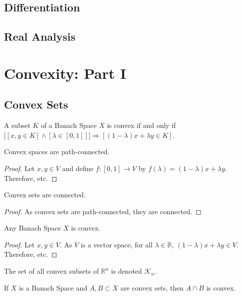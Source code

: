 \documentclass[crop=false,class=book,oneside]{standalone}
\begin{document}
        \subsection{Differentiation}
        \subsection{Real Analysis}
    \section{Convexity: Part I}
        \subsection{Convex Sets}
            \begin{definition}
            A subset $K$ of a Banach Space $X$ is convex if and only if $\big[[x,y\in K]\land  [\lambda \in [0,1]]\big]\Rightarrow[(1-\lambda)x+\lambda y\in K]$.
            \end{definition}
            \begin{theorem}
            Convex spaces are path-connected.
            \end{theorem}
            \begin{proof}
            Let $x,y\in V$ and define $f:[0,1]\rightarrow V$ by $f(\lambda) = (1-\lambda)x+\lambda y$. Therefore, etc.
            \end{proof}
            \begin{corollary}
            Convex sets are connected.
            \end{corollary}
            \begin{proof}
            As convex sets are path-connected, they are connected.
            \end{proof}
            \begin{theorem}
            Any Banach Space $X$ is convex.
            \end{theorem}
            \begin{proof}
            Let $x,y\in V$. As $V$ is a vector space, for all $\lambda \in \mathbb{R}$, $(1-\lambda)x+\lambda y\in V$. Therefore, etc.
            \end{proof}
            \begin{notation}
            The set of all convex subsets of $\mathbb{R}^n$ is denoted $\mathscr{K}_n$.
            \end{notation}
            \begin{theorem}
            If $X$ is a Banach Space and $A,B\subset X$ are convex sets, then $A\cap B$ is convex.
            \end{theorem}
\end{document}

